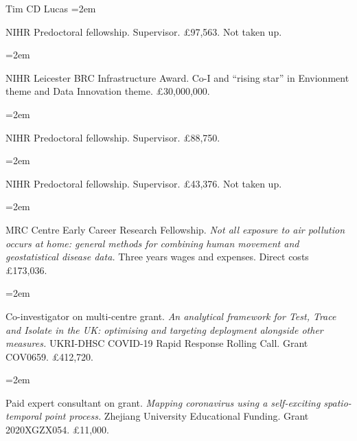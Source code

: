 \documentclass{scrartcl}
\newcommand{\MarginText}[1]{\marginpar{\raggedleft\itshape\small#1}} %
\newcommand{\Description}[1]{\hangindent=2em\hangafter=0\noindent\raggedright\footnotesize{#1}\par\normalsize\vspace{1em}} %
\begin{document}
\begin{cv}{Tim {\Large CD} Lucas}
\Description{NIHR Predoctoral fellowship. Supervisor. £97,563. Not taken up.}
\vspace{-0.5em} %

\Description{\MarginText{2022}NIHR Leicester BRC Infrastructure Award. Co-I and ``rising star'' in Envionment theme and Data Innovation theme. £30,000,000.}
\vspace{-0.5em} %


\Description{NIHR Predoctoral fellowship. Supervisor. £88,750.}
\vspace{-0.5em} %

\Description{NIHR Predoctoral fellowship. Supervisor. £43,376. Not taken up.}
\vspace{-0.5em} %


\Description{\MarginText{2020}MRC Centre Early Career Research Fellowship. \emph{Not all exposure to air pollution occurs at home: general methods for combining human movement and geostatistical disease data.} Three years wages and expenses. Direct costs £173,036.}
\vspace{-0.5em} %


\Description{Co-investigator on multi-centre grant. \emph{An analytical framework for Test, Trace and Isolate in the UK: optimising and targeting deployment alongside other measures.} UKRI-DHSC COVID-19 Rapid Response Rolling Call. Grant COV0659. £412,720.}
\vspace{-0.5em} %



\Description{Paid expert consultant on grant. \emph{Mapping coronavirus using a self-exciting spatio-temporal point process.} Zhejiang University Educational Funding. Grant 2020XGZX054. £11,000.}
\vspace{-0.5em} %



\vspace{1em} %









\end{cv}
\end{document}
